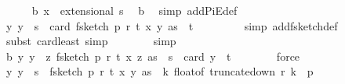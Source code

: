 \begin{isabellebody}
\ \ \ \ \isamarkupfalse%
\ b{\isacharunderscore}{\kern0pt}{}{\isacharcolon}{\kern0pt}\ {\isachardoublequoteopen}x\ {\isasymin}\ extensional\ {\isacharbraceleft}{\kern0pt}{}{\isachardot}{\kern0pt}{\isachardot}{\kern0pt}{\isacharless}{\kern0pt}s{\isacharbraceright}{\kern0pt}{\isachardoublequoteclose}\ \isamarkupfalse%
\ b{\isacharunderscore}{\kern0pt}{}\ \isamarkupfalse%
\ {\isacharparenleft}{\kern0pt}simp\ add{\isacharcolon}{\kern0pt}PiE{\isacharunderscore}{\kern0pt}def{\isacharparenright}{\kern0pt}\ \isanewline
\isanewline
\ \ \ \ \isamarkupfalse%
\ {\isachardoublequoteopen}{\isasymAnd}y{\isachardot}{\kern0pt}\ y\ {\isasymin}\ {\isacharbraceleft}{\kern0pt}{}{\isachardot}{\kern0pt}{\isachardot}{\kern0pt}{\isacharless}{\kern0pt}s{\isacharbraceright}{\kern0pt}\ {\isasymLongrightarrow}\ card\ {\isacharparenleft}{\kern0pt}f{}{\isacharunderscore}{\kern0pt}sketch\ p\ r\ t\ {\isacharparenleft}{\kern0pt}x\ y{\isacharparenright}{\kern0pt}\ as{\isacharparenright}{\kern0pt}\ {\isasymle}\ t\ {\isachardoublequoteclose}\isanewline
\ \ \ \ \ \ \isamarkupfalse%
\ {\isacharparenleft}{\kern0pt}simp\ add{\isacharcolon}{\kern0pt}f{}{\isacharunderscore}{\kern0pt}sketch{\isacharunderscore}{\kern0pt}def{\isacharparenright}{\kern0pt}\isanewline
\ \ \ \ \ \ \isamarkupfalse%
\ {\isacharparenleft}{\kern0pt}subst\ card{\isacharunderscore}{\kern0pt}least{\isacharcomma}{\kern0pt}\ simp{\isacharparenright}{\kern0pt}\isanewline
\ \ \ \ \ \ \isamarkupfalse%
\ simp\isanewline
\isanewline
\ \ \ \ \isamarkupfalse%
\ b{\isacharunderscore}{\kern0pt}{}{\isacharcolon}{\kern0pt}\ {\isachardoublequoteopen}{\isasymAnd}y{\isachardot}{\kern0pt}\ y\ {\isasymin}\ {\isacharparenleft}{\kern0pt}{\isasymlambda}z{\isachardot}{\kern0pt}\ f{}{\isacharunderscore}{\kern0pt}sketch\ p\ r\ t\ {\isacharparenleft}{\kern0pt}x\ z{\isacharparenright}{\kern0pt}\ as{\isacharparenright}{\kern0pt}\ {\isacharbackquote}{\kern0pt}\ {\isacharbraceleft}{\kern0pt}{}{\isachardot}{\kern0pt}{\isachardot}{\kern0pt}{\isacharless}{\kern0pt}s{\isacharbraceright}{\kern0pt}\ {\isasymLongrightarrow}\ card\ y\ {\isasymle}\ t{\isachardoublequoteclose}\isanewline
\ \ \ \ \ \ \isamarkupfalse%
\ force\isanewline
\isanewline
\ \ \ \ \isamarkupfalse%
\ {\isachardoublequoteopen}{\isasymAnd}y{\isachardot}{\kern0pt}\ y\ {\isasymin}\ {\isacharbraceleft}{\kern0pt}{}{\isachardot}{\kern0pt}{\isachardot}{\kern0pt}{\isacharless}{\kern0pt}s{\isacharbraceright}{\kern0pt}\ {\isasymLongrightarrow}\ f{}{\isacharunderscore}{\kern0pt}sketch\ p\ r\ t\ {\isacharparenleft}{\kern0pt}x\ y{\isacharparenright}{\kern0pt}\ as\ {\isasymsubseteq}\ {\isacharparenleft}{\kern0pt}{\isasymlambda}k{\isachardot}{\kern0pt}\ float{\isacharunderscore}{\kern0pt}of\ {\isacharparenleft}{\kern0pt}truncate{\isacharunderscore}{\kern0pt}down\ r\ k{\isacharparenright}{\kern0pt}{\isacharparenright}{\kern0pt}\ {\isacharbackquote}{\kern0pt}\ {\isacharbraceleft}{\kern0pt}{}{\isachardot}{\kern0pt}{\isachardot}{\kern0pt}{\isacharless}{\kern0pt}p{\isacharbraceright}{\kern0pt}\ {\isachardoublequoteclose}\isanewline

\end{isabellebody}
